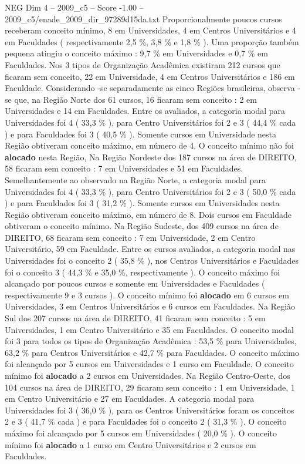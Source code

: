 \begin{textsample}{NEG Dim 4 – 2009\_c5 – Score -1.00 – 2009\_c5/enade\_2009\_dir\_97289d15da.txt}
Proporcionalmente poucos cursos receberam conceito mínimo, 8 em Universidades, 4 em Centros Universitários e 4 em Faculdades ( respectivamente 2,5 \%, 3,8 \% e 1,8 \% ).
Uma proporção também pequena atingiu o conceito máximo : 9,7 \% em Universidades e 0,7 \% em Faculdades.
Nos 3 tipos de Organização Acadêmica existiram 212 cursos que ficaram sem conceito, 22 em Universidade, 4 em Centros Universitários e 186 em Faculdade.
Considerando -se separadamente as cinco Regiões brasileiras, observa -se que, na Região Norte dos 61 cursos, 16 ficaram sem conceito : 2 em Universidades e 14 em Faculdades.
Entre os avaliados, a categoria modal para Universidades foi 4 ( 33,3 \% ), para Centro Universitários foi 2 e 3 ( 44,4 \% cada ) e para Faculdades foi 3 ( 40,5 \% ).
Somente cursos em Universidade nesta Região obtiveram conceito máximo, em número de 4.
O conceito mínimo não foi \textbf{alocado} nesta Região, Na Região Nordeste dos 187 cursos na área de DIREITO, 58 ficaram sem conceito : 7 em Universidades e 51 em Faculdades.
Semelhantemente ao observado na Região Norte, a categoria modal para Universidades foi 4 ( 33,3 \% ), para Centro Universitários foi 2 e 3 ( 50,0 \% cada ) e para Faculdades foi 3 ( 31,2 \% ).
Somente cursos em Universidades nesta Região obtiveram conceito máximo, em número de 8.
Dois cursos em Faculdade obtiveram o conceito mínimo.
Na Região Sudeste, dos 409 cursos na área de DIREITO, 68 ficaram sem conceito : 7 em Universidade, 2 em Centro Universitário, 59 em Faculdade.
Entre os cursos avaliados, a categoria modal nas Universidades foi o conceito 2 ( 35,8 \% ), nos Centros Universitários e Faculdades foi o conceito 3 ( 44,3 \% e 35,0 \%, respectivamente ).
O conceito máximo foi alcançado por poucos cursos e somente em Universidades e Faculdades ( respectivamente 9 e 3 cursos ).
O conceito mínimo foi \textbf{alocado} em 6 cursos em Universidades, 3 em Centros Universitários e 6 cursos em Faculdades.
Na Região Sul dos 207 cursos na área de DIREITO, 41 ficaram sem conceito : 5 em Universidades, 1 em Centro Universitário e 35 em Faculdades.
O conceito modal foi 3 para todos os tipos de Organização Acadêmica : 53,5 \% para Universidades, 63,2 \% para Centros Universitários e 42,7 \% para Faculdades.
O conceito máximo foi alcançado por 5 cursos em Universidades e 1 curso em Faculdade.
O conceito mínimo foi \textbf{alocado} a 2 cursos em Universidades.
Na Região Centro-Oeste, dos 104 cursos na área de DIREITO, 29 ficaram sem conceito : 1 em Universidade, 1 em Centro Universitário e 27 em Faculdades.
A categoria modal para Universidades foi 3 ( 36,0 \% ), para os Centros Universitários foram os conceitos 2 e 3 ( 41,7 \% cada ) e para Faculdades foi o conceito 2 ( 31,3 \% ).
O conceito máximo foi alcançado por 5 cursos em Universidades ( 20,0 \% ).
O conceito mínimo foi \textbf{alocado} a 1 curso em Centro Universitários e 2 cursos em Faculdades.

\end{textsample}
